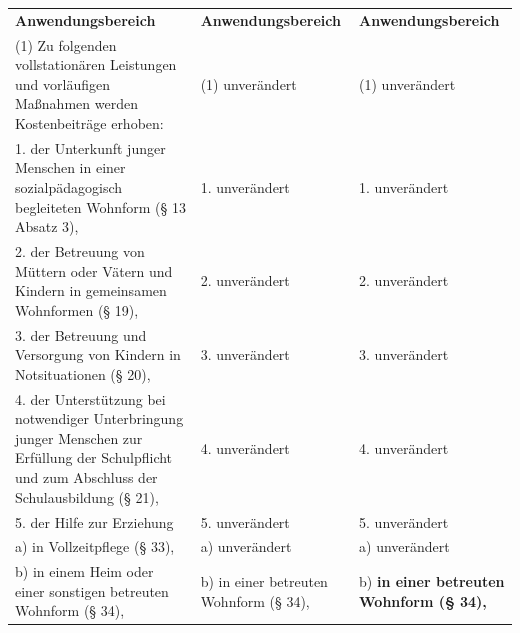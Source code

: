 \documentclass[10pt,a4paper,landscape]{article}
\begin{document}
\begin{longtable}{|L{8.2cm}|L{8.2cm}|L{8.2cm}|}
\hhline{|---|}
\textbf{Anwendungsbereich } & \textbf{Anwendungsbereich } & \textbf{Anwendungsbereich } \\
\hhline{|---|}
(1) Zu folgenden vollstationären Leistungen  \newline und vorläufigen Maßnahmen werden  \newline Kostenbeiträge erhoben: & (1) unverändert & (1) unverändert \\
\hhline{|---|}
1.   \newline der Unterkunft junger Menschen in einer  \newline sozialpädagogisch begleiteten Wohnform  \newline (\S{} 13 Absatz 3), & 1. unverändert & 1. unverändert \\
\hhline{|---|}
2.   \newline der Betreuung von Müttern oder Vätern  \newline und Kindern in gemeinsamen Wohnformen  \newline (\S{} 19), & 2. unverändert & 2. unverändert \\
\hhline{|---|}
3.   \newline der Betreuung und Versorgung von  \newline Kindern in Notsituationen (\S{} 20), & 3. unverändert & 3. unverändert \\
\hhline{|---|}
4.   \newline der Unterstützung bei notwendiger  \newline Unterbringung junger Menschen zur  \newline Erfüllung der Schulpflicht und zum  \newline Abschluss der Schulausbildung (\S{} 21), & 4. unverändert & 4. unverändert \\
\hhline{|---|}
5.   \newline der Hilfe zur Erziehung & 5. unverändert & 5. unverändert \\
\hhline{|---|}
a)   \newline in Vollzeitpflege (\S{} 33), & a) unverändert & a) unverändert \\
\hhline{|---|}
b)   \newline in \textcolor{diffred}{einem Heim oder} einer \textcolor{diffred}{sonstigen}  \newline betreuten Wohnform (\S{} 34), & b)   \newline in einer betreuten Wohnform (\S{} 34), & b)   \newline \textbf{in einer betreuten Wohnform (\S{} 34),  } \\

\end{longtable}
\end{document}
